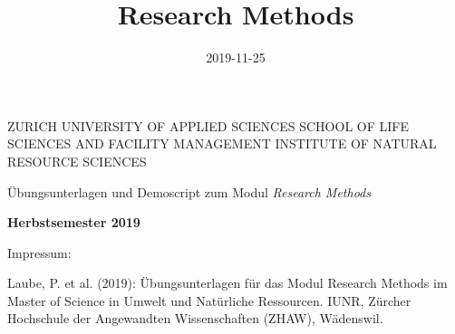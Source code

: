 \documentclass[]{book}
\title{Research Methods}
\author{}
\date{2019-11-25}
\begin{document}
\maketitle


\begin{titlepage}
\begin{center}
  
{\small 
ZURICH UNIVERSITY OF APPLIED SCIENCES
\linebreak SCHOOL OF LIFE SCIENCES AND FACILITY MANAGEMENT
\linebreak INSTITUTE OF NATURAL RESOURCE SCIENCES
}

\end{center}
\vspace{1.5cm}
\begin{center}

{\Large Übungsunterlagen und Demoscript zum Modul \emph{Research Methods}}

\end{center}
 \vspace{1cm}


\begin{center}
\textbf{Herbstsemester 2019}


\end{center} 

\vspace{1.0cm}


\newpage
\thispagestyle{empty}
\begin{minipage}{15cm}
\begin{flushleft}




\vspace{18cm}
{\large Impressum:}

\vspace{0.5cm}

Laube, P. et al. (2019): Übungsunterlagen für das Modul Research Methods im Master of Science in Umwelt und Natürliche Ressourcen. IUNR, Zürcher Hochschule der Angewandten Wissenschaften (ZHAW), W{\"a}denswil.

\end{flushleft}
\end{minipage}

\end{titlepage}
\restoregeometry
\end{document}
